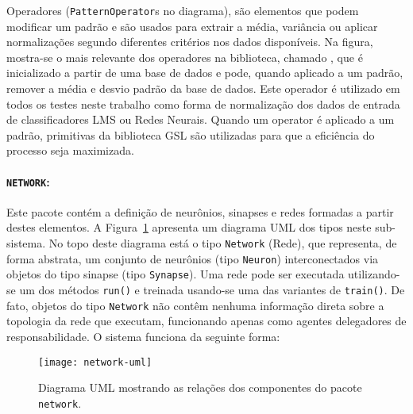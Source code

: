 Operadores (\texttt{PatternOperator}s no diagrama), são elementos que podem
modificar um padrão e são usados para extrair a média, variância ou aplicar
normalizações segundo diferentes critérios nos dados disponíveis. Na figura,
mostra-se o mais relevante dos operadores na biblioteca, chamado
, que é inicializado a partir de uma base de dados
e pode, quando aplicado a um padrão, remover a média e desvio padrão da base
de dados. Este operador é utilizado em todos os testes neste trabalho como
forma de normalização dos dados de entrada de classificadores LMS ou Redes
Neurais. Quando um operator é aplicado a um padrão, primitivas da biblioteca
GSL são utilizadas para que a eficiência do processo seja maximizada.

\paragraph{\texttt{NETWORK}:} Este pacote contém a definição de
neurônios, sinapses e redes formadas a partir destes elementos. A
Figura~\ref{fig:network-uml} apresenta um diagrama UML dos tipos neste
sub-sistema. No topo deste diagrama está o tipo \texttt{Network} (Rede), que
representa, de forma abstrata, um conjunto de neurônios (tipo \texttt{Neuron})
interconectados via objetos do tipo sinapse (tipo \texttt{Synapse}). Uma rede
pode ser executada utilizando-se um dos métodos \texttt{run()} e treinada
usando-se uma das variantes de \texttt{train()}. De fato, objetos do tipo
\texttt{Network} não contêm nenhuma informação direta sobre a topologia da
rede que executam, funcionando apenas como agentes delegadores de
responsabilidade. O sistema funciona da seguinte forma:

\begin{figure}
\begin{center}
\texttt{[image: network-uml]}
\end{center}
\caption{Diagrama UML mostrando as relações dos componentes do pacote
\texttt{network}.}
\label{fig:network-uml}
\end{figure}

